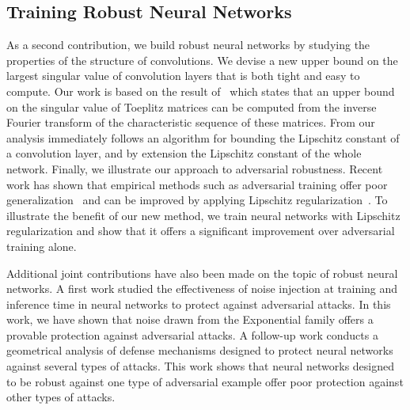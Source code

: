 


\subsection{Training Robust Neural Networks}
\label{subsection:ch1-training_robust_neural_networks}

As a second contribution, we build robust neural networks by studying the properties of the structure of convolutions.
We devise a new upper bound on the largest singular value of convolution layers that is both tight and easy to compute.
Our work is based on the result of~\citet{gray2006toeplitz} which states that an upper bound on the singular value of Toeplitz matrices can be computed from the inverse Fourier transform of the characteristic sequence of these matrices.
From our analysis immediately follows an algorithm for bounding the Lipschitz constant of a convolution layer, and by extension the Lipschitz constant of the whole network.
Finally, we illustrate our approach to adversarial robustness.
Recent work has shown that empirical methods such as adversarial training offer poor generalization~\cite{schmidt2018adversarially} and can be improved by applying Lipschitz regularization~\cite{farnia2018generalizable}.
To illustrate the benefit of our new method, we train neural networks with Lipschitz regularization and show that it offers a significant improvement over adversarial training alone.

Additional joint contributions have also been made on the topic of robust neural networks.
A first work studied the effectiveness of noise injection at training and inference time in neural networks to protect against adversarial attacks.
In this work, we have shown that noise drawn from the Exponential family offers a provable protection against adversarial attacks. 
A follow-up work conducts a geometrical analysis of defense mechanisms designed to protect neural networks against several types of attacks.
This work shows that neural networks designed to be robust against one type of adversarial example offer poor protection against other types of attacks.


